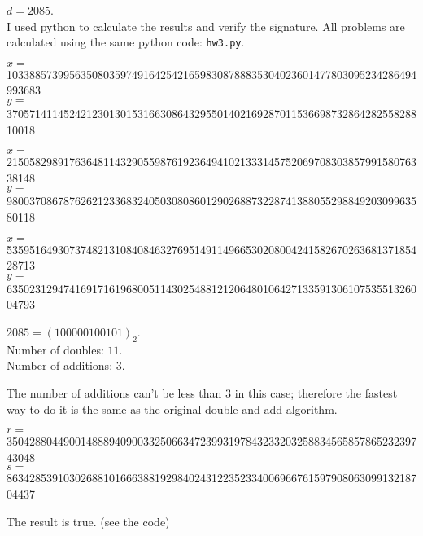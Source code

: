 \noindent
$d=2085$.\\
I used python to calculate the results and verify the signature. All problems are calculated using the same python code: \texttt{hw3.py}.

\begin{pr}$ $\\
$x=$103388573995635080359749164254216598308788835304023601477803095234286494993683\\
$y=$37057141145242123013015316630864329550140216928701153669873286428255828810018
\end{pr}

\begin{pr}$ $\\
$x=$21505829891763648114329055987619236494102133314575206970830385799158076338148\\
$y=$98003708678762621233683240503080860129026887322874138805529884920309963580118
\end{pr}

\begin{pr}$ $\\
$x=$53595164930737482131084084632769514911496653020800424158267026368137185428713\\
$y=$63502312947416917161968005114302548812120648010642713359130610753551326004793
\end{pr}

\begin{pr}
$2085=(100000100101)_2$.\\
Number of doubles: $11$.\\
Number of additions: $3$.
\end{pr}

\begin{pr}
The number of additions can't be less than $3$ in this case; therefore the fastest way to do it is the same as the original double and add algorithm.
\end{pr}

\begin{pr}$ $\\
$r=$35042880449001488894090033250663472399319784323320325883456585786523239743048\\
$s=$86342853910302688101666388192984024312235233400696676159790806309913218704437
\end{pr}

\begin{pr}
The result is true. (see the code)
\end{pr}

